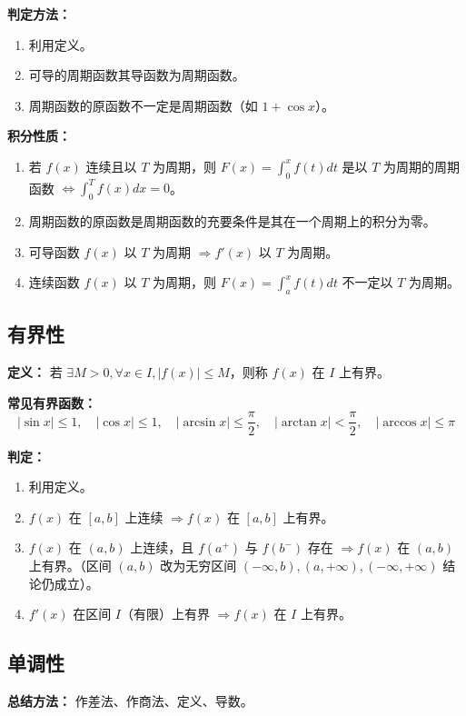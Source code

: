 \documentclass[a4paper,12pt]{ctexart} %
\newenvironment{purplebox}
  {\begin{tcolorbox}[colback=white, colframe=boxpurple, boxrule=1pt, sharp corners, title=\textbf{定义/定理}]}
  {\end{tcolorbox}}
\newcommand{\zh}[1]{\par\smallskip\noindent\textbf{#1}\par\smallskip}
\begin{document}
\textbf{判定方法：}
\begin{enumerate}
    \item 利用定义。
    \item 可导的周期函数其导函数为周期函数。
    \item 周期函数的原函数不一定是周期函数（如 $1 + \cos x$）。
\end{enumerate}

\zh{积分性质：}
\begin{enumerate}
    \item 若 $f(x)$ 连续且以 $T$ 为周期，则
    $F(x) = \int_0^x f(t) dt$ 是以 $T$ 为周期的周期函数 $\Leftrightarrow \int_0^T f(x) dx = 0$。
    \item 周期函数的原函数是周期函数的充要条件是其在一个周期上的积分为零。
    \item 可导函数 $f(x)$ 以 $T$ 为周期 $\Rightarrow f'(x)$ 以 $T$ 为周期。
    \item 连续函数 $f(x)$ 以 $T$ 为周期，则 $F(x) = \int_a^x f(t) dt$ 不一定以 $T$ 为周期。
\end{enumerate}

\subsection{有界性}
\begin{purplebox}
    \textbf{定义：} 若 $\exists M > 0, \forall x \in I, |f(x)| \leqslant M$，则称 $f(x)$ 在 $I$ 上有界。
\end{purplebox}

\textbf{常见有界函数：}
\[ |\sin x| \leqslant 1, \quad |\cos x| \leqslant 1, \quad |\arcsin x| \leqslant \frac{\pi}{2}, \quad |\arctan x| < \frac{\pi}{2}, \quad |\arccos x| \leqslant \pi \]

\textbf{判定：}
\begin{enumerate}
    \item 利用定义。
    \item $f(x)$ 在 $[a, b]$ 上连续 $\Rightarrow f(x)$ 在 $[a, b]$ 上有界。
    \item $f(x)$ 在 $(a, b)$ 上连续，且 $f(a^+)$ 与 $f(b^-)$ 存在 $\Rightarrow f(x)$ 在 $(a, b)$ 上有界。（区间 $(a, b)$ 改为无穷区间 $(-\infty, b), (a, +\infty), (-\infty, +\infty)$ 结论仍成立）。
    \item $f'(x)$ 在区间 $I$（有限）上有界 $\Rightarrow f(x)$ 在 $I$ 上有界。
\end{enumerate}

\subsection{单调性}
\textbf{总结方法：} 作差法、作商法、定义、导数。
\end{document}
